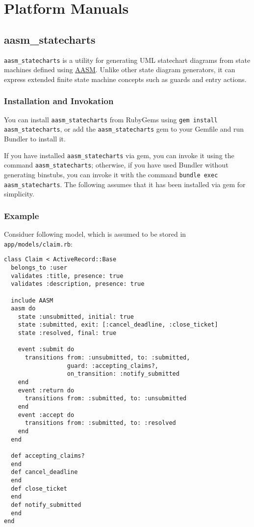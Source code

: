 \documentclass[document.tex]{subfiles}
\begin{document}
\chapter{Platform Manuals}
\label {ch:appendix-manuals}


\section{aasm\_statecharts}
\label{sec:aasm-statecharts-manual}

{\tt aasm\_statecharts} is a utility for generating UML statechart diagrams from state machines defined using \href{https://github.com/aasm/aasm}{AASM}. Unlike other state diagram generators, it can express extended finite state machine concepts such as guards and entry actions.

\subsection{Installation and Invokation}

You can install {\tt aasm\_statecharts} from RubyGems using {\tt gem install aasm\_statecharts}, or add the {\tt aasm\_statecharts} gem to your Gemfile and run Bundler to install it.

If you have installed {\tt aasm\_statecharts} via gem, you can invoke it using the command {\tt aasm\_statecharts}; otherwise, if you have used Bundler without generating binstubs, you can invoke it with the command {\tt bundle exec aasm\_statecharts}. The following assumes that it has been installed via gem for simplicity.

\pagebreak

\subsection{Example}

Considuer following model, which is assumed to be stored in {\tt app/models/claim.rb}:
\begin{lstlisting}
class Claim < ActiveRecord::Base
  belongs_to :user
  validates :title, presence: true
  validates :description, presence: true

  include AASM
  aasm do
    state :unsubmitted, initial: true
    state :submitted, exit: [:cancel_deadline, :close_ticket]
    state :resolved, final: true

    event :submit do
      transitions from: :unsubmitted, to: :submitted,
                  guard: :accepting_claims?,
                  on_transition: :notify_submitted
    end
    event :return do
      transitions from: :submitted, to: :unsubmitted
    end
    event :accept do
      transitions from: :submitted, to: :resolved
    end
  end

  def accepting_claims?
  end
  def cancel_deadline
  end
  def close_ticket
  end
  def notify_submitted
  end
end
\end{lstlisting}
\end{document}
